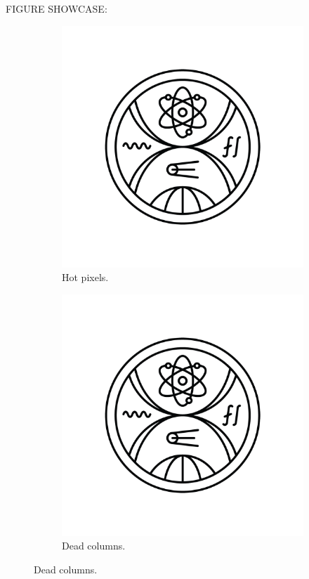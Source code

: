 {FIGURE SHOWCASE:
\begin{figure}[!h]
	\centering
	\begin{subfigure}{.3\textwidth}
		\centering
		\includegraphics[width=\textwidth]{images/FMFI_logo_BP.png}
		\caption{Hot pixels.}
		\label{fig:hotpixels}
	\end{subfigure}
	\begin{subfigure}{.3\textwidth}
		\centering
		\includegraphics[width=\textwidth]{images/FMFI_logo_BP.png}
		\caption{Dead columns.}
		\label{fig:deadcolumns}
	\end{subfigure}
	

\end{figure}}
